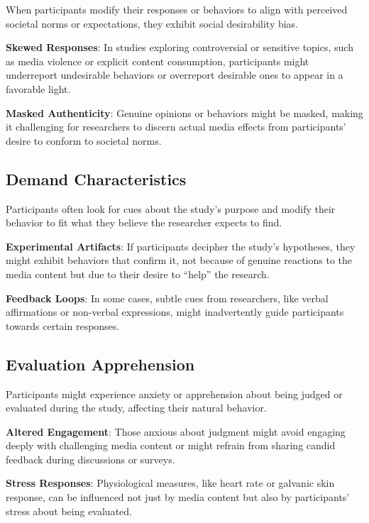 \documentclass[
  b5paper]{book}
\begin{document}
When participants modify their responses or behaviors to align with perceived societal norms or expectations, they exhibit social desirability bias.

\textbf{Skewed Responses}: In studies exploring controversial or sensitive topics, such as media violence or explicit content consumption, participants might underreport undesirable behaviors or overreport desirable ones to appear in a favorable light.

\textbf{Masked Authenticity}: Genuine opinions or behaviors might be masked, making it challenging for researchers to discern actual media effects from participants' desire to conform to societal norms.

\hypertarget{demand-characteristics}{%
\subsection*{Demand Characteristics}\label{demand-characteristics}}

Participants often look for cues about the study's purpose and modify their behavior to fit what they believe the researcher expects to find.

\textbf{Experimental Artifacts}: If participants decipher the study's hypotheses, they might exhibit behaviors that confirm it, not because of genuine reactions to the media content but due to their desire to ``help'' the research.

\textbf{Feedback Loops}: In some cases, subtle cues from researchers, like verbal affirmations or non-verbal expressions, might inadvertently guide participants towards certain responses.

\hypertarget{evaluation-apprehension}{%
\subsection*{Evaluation Apprehension}\label{evaluation-apprehension}}

Participants might experience anxiety or apprehension about being judged or evaluated during the study, affecting their natural behavior.

\textbf{Altered Engagement}: Those anxious about judgment might avoid engaging deeply with challenging media content or might refrain from sharing candid feedback during discussions or surveys.

\textbf{Stress Responses}: Physiological measures, like heart rate or galvanic skin response, can be influenced not just by media content but also by participants' stress about being evaluated.
\end{document}
